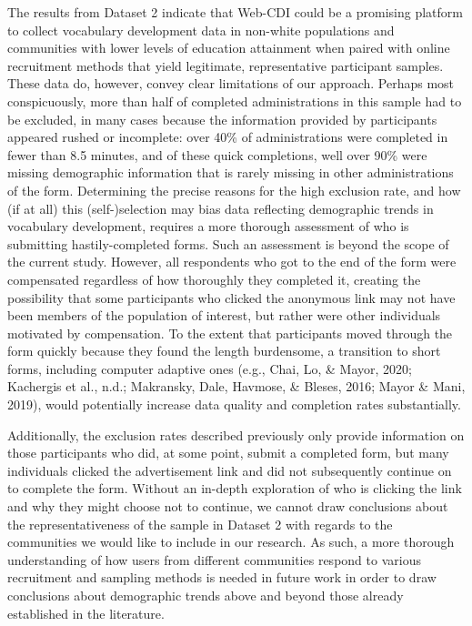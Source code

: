 \documentclass[
  english,
  ,man,floatsintext]{apa6}
\begin{document}
The results from Dataset 2 indicate that Web-CDI could be a promising platform to collect vocabulary development data in non-white populations and communities with lower levels of education attainment when paired with online recruitment methods that yield legitimate, representative participant samples. These data do, however, convey clear limitations of our approach. Perhaps most conspicuously, more than half of completed administrations in this sample had to be excluded, in many cases because the information provided by participants appeared rushed or incomplete: over 40\% of administrations were completed in fewer than 8.5 minutes, and of these quick completions, well over 90\% were missing demographic information that is rarely missing in other administrations of the form. Determining the precise reasons for the high exclusion rate, and how (if at all) this (self-)selection may bias data reflecting demographic trends in vocabulary development, requires a more thorough assessment of who is submitting hastily-completed forms. Such an assessment is beyond the scope of the current study. However, all respondents who got to the end of the form were compensated regardless of how thoroughly they completed it, creating the possibility that some participants who clicked the anonymous link may not have been members of the population of interest, but rather were other individuals motivated by compensation. To the extent that participants moved through the form quickly because they found the length burdensome, a transition to short forms, including computer adaptive ones (e.g., Chai, Lo, \& Mayor, 2020; Kachergis et al., n.d.; Makransky, Dale, Havmose, \& Bleses, 2016; Mayor \& Mani, 2019), would potentially increase data quality and completion rates substantially.

Additionally, the exclusion rates described previously only provide information on those participants who did, at some point, submit a completed form, but many individuals clicked the advertisement link and did not subsequently continue on to complete the form. Without an in-depth exploration of who is clicking the link and why they might choose not to continue, we cannot draw conclusions about the representativeness of the sample in Dataset 2 with regards to the communities we would like to include in our research. As such, a more thorough understanding of how users from different communities respond to various recruitment and sampling methods is needed in future work in order to draw conclusions about demographic trends above and beyond those already established in the literature.
\end{document}
